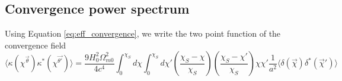 \documentclass[12pt]{article}
\newcommand{\beqa}{\begin{eqnarray}}
\newcommand{\eeqa}{\end{eqnarray}}
\numberwithin{equation}{section}
\begin{document}
%
%
%

\subsection{Convergence power spectrum }

Using Equation \ref{eq:eff_convergence}, we write the two point function of the convergence field
\begin{equation}
\langle \kappa(\chi^{\vec{\theta}}) \kappa^*(\chi^{\vec{\theta'}})\rangle = \frac{9 H_0^2 \Omega_{m0}^2}{4 c^4} \int_0^{\chi_S} d\chi \int_0^{\chi_S} d\chi'  \left(\frac{\chi_S - \chi}{\chi_S}\right) \left(\frac{\chi_S - \chi'}{\chi_S}\right) \chi \chi' \frac{1}{a^2} \langle\delta(\vec{\chi}) \delta^*(\vec{\chi}') \rangle 
\end{equation}

\end{document}
